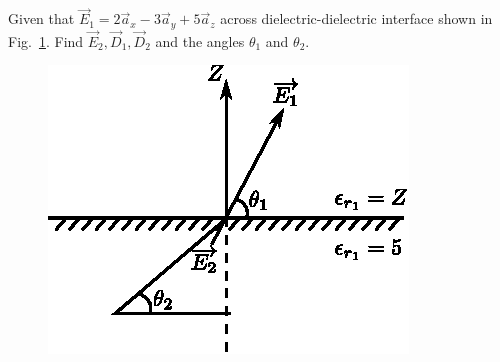 \begin{problem}
Given that $\overrightarrow{E}_{1} = 2\overrightarrow{a}_{x} - 3\overrightarrow{a}_{y} + 5\overrightarrow{a}_{z}$ across dielectric-dielectric interface shown in Fig.~\ref{chap27-fig3}. Find $\overrightarrow{E}_{2}, \overrightarrow{D}_{1}, \overrightarrow{D}_{2}$ and the angles $\theta_{1}$ and $\theta_{2}$. 
\begin{figure}[H]
\centering
\includegraphics[scale=1.1]{images/fig3.eps}\label{chap27-fig3}
\end{figure}
\end{problem}

